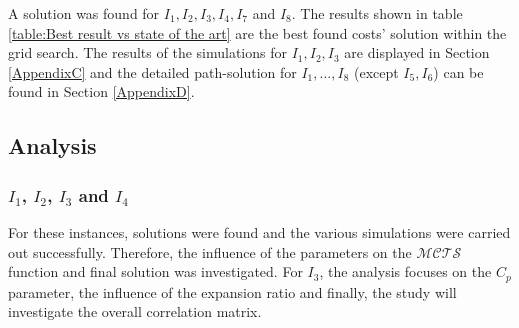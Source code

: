 \begin{table}[!ht]
    \centering
    \caption{Best results vs State of the art}
    \label{table:Best result vs state of the art}
\end{table}

A solution was found for $I_1, I_2, I_3, I_4,I_7$ and $I_8$. The results shown in table \ref{table:Best result vs state of the art} are the best found costs' solution within the grid search. The results of the simulations for $I_1, I_2, I_3$ are displayed in Section \ref{AppendixC} and the detailed path-solution for $I_1,\ldots, I_8$ (except $I_5, I_6$) can be found in Section \ref{AppendixD}.
\newpage
\subsection{Analysis}
\subsubsection{$I_1$, $I_2$, $I_3$ and $I_4$}
For these instances, solutions were found and the various simulations were carried out successfully. Therefore, the influence of the parameters on the $\mathcal{MCTS}$ function and final solution was investigated. For $I_3$, the analysis focuses on the $C_p$ parameter, the influence of the expansion ratio and finally, the study will investigate the overall correlation matrix.

